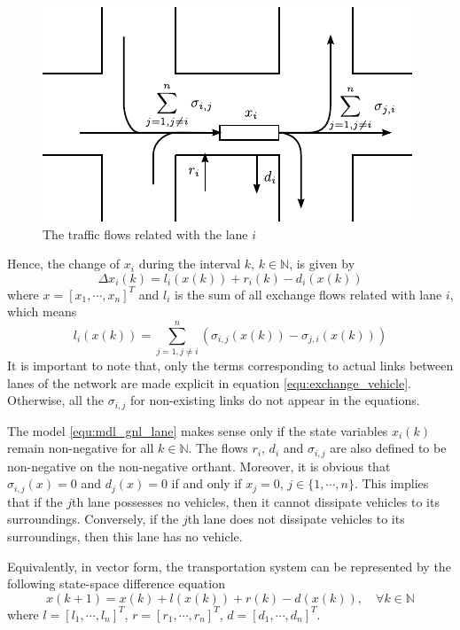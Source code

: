 \documentclass[trsc,nonblindrev]{informs3} %
\renewcommand{\vec}[1]{#1}
\begin{document}
\begin{figure}[ht]
  \centering
  \includegraphics{pics/flows}
  \caption{The traffic flows related with the lane $i$}
  \label{fig:flows}
\end{figure}

Hence, the change of $x_i$ during the interval
$k$, $k\in\mathbb{N}$, is given by
\begin{equation}\label{equ:mdl_gnl_lane}
\Delta x_i(k) = l_i(\vec{x}(k))+r_i(k)-d_i(\vec{x}(k))
\end{equation}
where $\vec{x}=[x_1,\cdots,x_n]^T$ and $l_i$ is the sum of all exchange flows related with lane $i$,
which means
\begin{equation}\label{equ:exchange_vehicle}
 l_i(\vec{x}(k))=\sum_{j=1,j\neq i}^{n}(\sigma_{i,j}(\vec{x}(k))-\sigma_{j,i}(\vec{x}(k)))
\end{equation}
It is important to note that, only the terms corresponding to actual
links between lanes  of the network are made explicit in  equation
\eqref{equ:exchange_vehicle}. Otherwise, all the $\sigma_{i,j}$ for
non-existing links do not appear in the equations.


The model \eqref{equ:mdl_gnl_lane} makes sense only if the state
variables $x_i(k)$ remain non-negative for all $k\in \mathbb{N}$. The
flows $r_i$, $d_{i}$ and $\sigma_{i,j}$ are also defined
to be non-negative on the non-negative orthant. Moreover, it is
obvious that  $\sigma_{i,j}(\vec{x})=0$ and $d_{j}(\vec{x})=0$ if and only if
$x_j=0$, $j\in\{1,\cdots,n\}$. This implies that if the $j$th lane
possesses no vehicles, then it cannot dissipate vehicles to its
surroundings. Conversely, if the $j$th lane does not dissipate
vehicles to its surroundings, then this lane has no vehicle.

Equivalently, in vector form, the transportation system can be
represented by the following state-space difference equation
\begin{equation}\label{equ:mdl_gnl}
\vec{x}(k+1)=\vec{x}(k)+\vec{l}(\vec{x}(k))+\vec{r}(k)-\vec{d}(\vec{x}(k)),\quad \forall k\in\mathbb{N}
\end{equation}
where $\vec{l}=[l_1,\cdots,l_n]^T$,
$\vec{r}=[r_1,\cdots,r_n]^T$, $\vec{d}=[d_1,\cdots,d_n]^T$.
\end{document}
